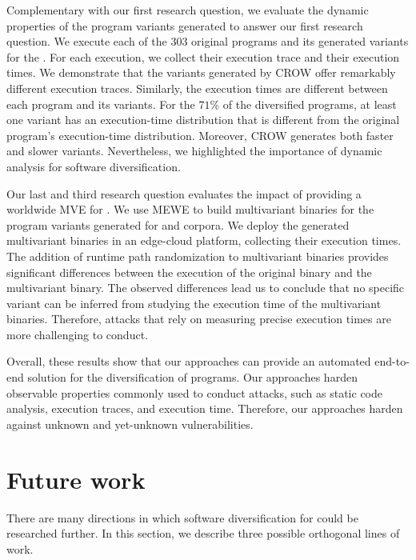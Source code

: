 Complementary with our first research question, we evaluate the dynamic properties of the program variants generated to answer our first research question.
We execute each of the 303 original programs and its generated variants for the \corpusrosetta.
For each execution, we collect their execution trace and their execution times.
We demonstrate that the \wasm variants generated by CROW offer remarkably different execution traces.
Similarly, the execution times are different between each program and its variants.
For the $71\%$ of the diversified programs, at least one variant has an execution-time distribution that is different from the original program's execution-time distribution.
Moreover, CROW generates both faster and slower variants.
Nevertheless, we highlighted the importance of dynamic analysis for software diversification. 

Our last and third research question evaluates the impact of providing a worldwide MVE for \wasm.
We use MEWE to build multivariant binaries for the program variants generated for \corpussodium and \corpusqrcode corpora.
We deploy the generated multivariant binaries in an edge-cloud platform, collecting their execution times.
The addition of runtime path randomization to multivariant binaries provides significant differences between the execution of the original binary and the multivariant binary.
The observed differences lead us to conclude that no specific variant can be inferred from studying the execution time of the multivariant binaries. Therefore, attacks that rely on measuring precise execution times are more challenging to conduct.


Overall, these results show that our approaches can provide an automated end-to-end solution for the diversification of \wasm programs. 
Our approaches harden observable properties commonly used to conduct attacks, such as static code analysis, execution traces, and execution time.
Therefore, our approaches harden \wasm against unknown and yet-unknown vulnerabilities.


\section{Future work}
\label{future_work}

There are many directions in which software diversification for \wasm could be researched further.
In this section, we describe three possible orthogonal lines of work.

\\
\\

